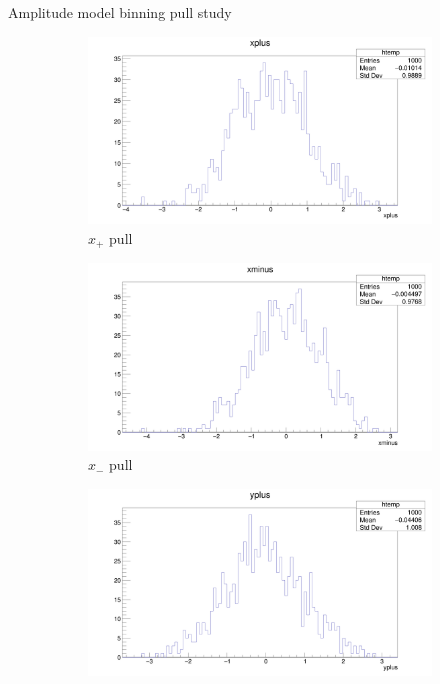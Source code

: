 \documentclass{beamer}
\begin{document}
\begin{frame}{Amplitude model binning pull study}
  \begin{figure}
    \centering
    \vspace{-0.2cm}
    \begin{subfigure}{0.5\textwidth}
      \includegraphics[width = 1.0\textwidth]{AmplitudePulls/xplus1K1K.png}
      \caption{$x_+$ pull}
    \end{subfigure}%
    \begin{subfigure}{0.5\textwidth}
      \includegraphics[width = 1.0\textwidth]{AmplitudePulls/xminus1K1K.png}
      \caption{$x_-$ pull}
    \end{subfigure}
    \begin{subfigure}{0.5\textwidth}
      \includegraphics[width = 1.0\textwidth]{AmplitudePulls/yplus1K1K.png}

\end{subfigure}
\end{figure}
\end{frame}
\end{document}
